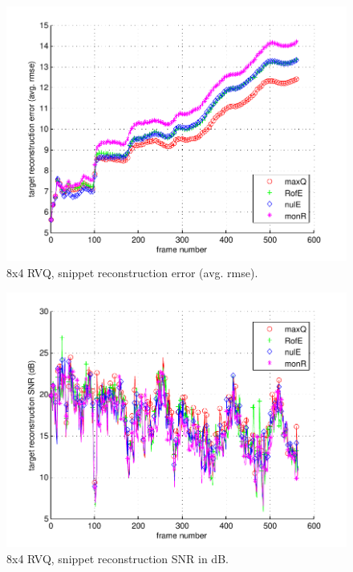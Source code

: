 								\begin{figure}[h!]
								\centering
								\includegraphics[height=0.4\textheight]{thesis/1_Dudek_8_4_1000_snp_armse.pdf}
								\caption{8x4 RVQ, snippet reconstruction error (avg. rmse).}
								\label{fig:1_Dudek_8_4_1000_snp_armse}
								\end{figure}

								\begin{figure}[h!]
								\centering
								\includegraphics[height=0.4\textheight]{thesis/1_Dudek_8_4_1000_snp_SNRdB.pdf}
								\caption{8x4 RVQ, snippet reconstruction SNR in dB.}
								\label{fig:1_Dudek_8_4_1000_snp_SNRdB}
								\end{figure}
\clearpage
\newpage

